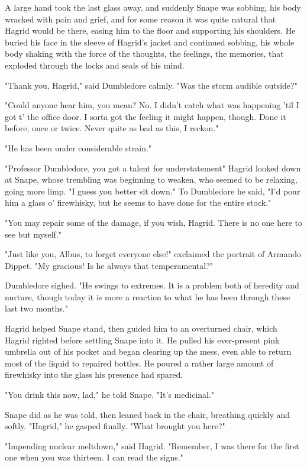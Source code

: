 A large hand took the last glass away, and suddenly Snape was sobbing, his body wracked with pain and grief, and for some reason it was quite natural that Hagrid would be there, easing him to the floor and supporting his shoulders. He buried his face in the sleeve of Hagrid's jacket and continued sobbing, his whole body shaking with the force of the thoughts, the feelings, the memories, that exploded through the locks and seals of his mind.

"Thank you, Hagrid," said Dumbledore calmly. "Was the storm audible outside?"

"Could anyone hear him, you mean? No. I didn't catch what was happening 'til I got t' the office door. I sorta got the feeling it might happen, though. Done it before, once or twice. Never quite as bad as this, I reckon."

"He has been under considerable strain."

"Professor Dumbledore, you got a talent for understatement{\el}" Hagrid looked down at Snape, whose trembling was beginning to weaken, who seemed to be relaxing, going more limp. "I guess you better sit down." To Dumbledore he said, "I'd pour him a glass o' firewhisky, but he seems to have done for the entire stock."

"You may repair some of the damage, if you wish, Hagrid. There is no one here to see but myself."

"Just like you, Albus, to forget everyone else!" exclaimed the portrait of Armando Dippet. "My gracious! Is he always that temperamental?"

Dumbledore sighed. "He swings to extremes. It is a problem both of heredity and nurture, though today it is more a reaction to what he has been through these last two months."

Hagrid helped Snape stand, then guided him to an overturned chair, which Hagrid righted before settling Snape into it. He pulled his ever-present pink umbrella out of his pocket and began clearing up the mess, even able to return most of the liquid to repaired bottles. He poured a rather large amount of firewhisky into the glass his presence had spared.

"You drink this now, lad," he told Snape. "It's medicinal."

Snape did as he was told, then leaned back in the chair, breathing quickly and softly. "Hagrid," he gasped finally. "What brought you here?"

"Impending nuclear meltdown," said Hagrid. "Remember, I was there for the first one when you was thirteen. I can read the signs."

